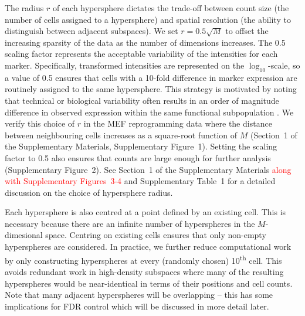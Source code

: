 \documentclass{article}
\newcommand\revised[1]{\textcolor{red}{#1}}
\newcommand{\supphyperradverify}{1}
\newcommand{\suppfighyperrad}{1}
\newcommand{\suppfighypertol}{2}
\newcommand{\suppfigradsim}{3-4}
\newcommand{\supptabparam}{1}
\begin{document}

The radius $r$ of each hypersphere dictates the trade-off between count size (the number of cells assigned to a hypersphere) and spatial resolution (the ability to distinguish between adjacent subspaces).
We set $r=0.5\sqrt{M}$ to offset the increasing sparsity of the data as the number of dimensions increases.
The 0.5 scaling factor represents the acceptable variability of the intensities for each marker.
Specifically, transformed intensities are represented on the $\log_{10}$-scale, so a value of 0.5 ensures that cells with a 10-fold difference in marker expression are routinely assigned to the same hypersphere.
This strategy is motivated by noting that technical or biological variability often results in an order of magnitude difference in observed expression within the same functional subpopulation \cite{ornatsky2008study,zunder2015continuous,zunder2015palladium}.
We verify this choice of $r$ in the MEF reprogramming data where the distance between neighbouring cells increases as a square-root function of $M$ (Section~\supphyperradverify{} of the Supplementary Materials, Supplementary Figure~\suppfighyperrad{}).
Setting the scaling factor to 0.5 also ensures that counts are large enough for further analysis (Supplementary Figure~\suppfighypertol{}).
See Section~\supphyperradverify{} of the Supplementary Materials \revised{along with Supplementary Figures~\suppfigradsim{}} and Supplementary Table~\supptabparam{} for a detailed discussion on the choice of hypersphere radius.

Each hypersphere is also centred at a point defined by an existing cell.
This is necessary because there are an infinite number of hyperspheres in the $M$-dimesional space.
Centring on existing cells ensures that only non-empty hyperspheres are considered.
In practice, we further reduce computational work by only constructing hyperspheres at every (randomly chosen) 10\textsuperscript{th} cell.
This avoids redundant work in high-density subspaces where many of the resulting hyperspheres would be near-identical in terms of their positions and cell counts.
Note that many adjacent hyperspheres will be overlapping -- this has some implications for FDR control which will be discussed in more detail later.
\end{document}

